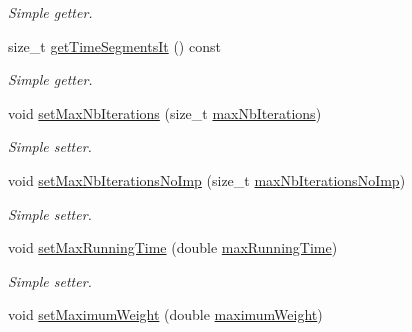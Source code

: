 \begin{DoxyCompactItemize}
\begin{DoxyCompactList}\small\item\em Simple getter. \end{DoxyCompactList}\item 
\hypertarget{classALNS__Parameters_abdf176674f4e3d1885ddb2d6f4c8d21b}{size\-\_\-t \hyperlink{classALNS__Parameters_abdf176674f4e3d1885ddb2d6f4c8d21b}{get\-Time\-Segments\-It} () const }\label{classALNS__Parameters_abdf176674f4e3d1885ddb2d6f4c8d21b}

\begin{DoxyCompactList}\small\item\em Simple getter. \end{DoxyCompactList}\item 
\hypertarget{classALNS__Parameters_a4fccf02da9977844d97530e98939a9c4}{void \hyperlink{classALNS__Parameters_a4fccf02da9977844d97530e98939a9c4}{set\-Max\-Nb\-Iterations} (size\-\_\-t \hyperlink{classALNS__Parameters_ab87f8386bbdca4a6ad80969221241b89}{max\-Nb\-Iterations})}\label{classALNS__Parameters_a4fccf02da9977844d97530e98939a9c4}

\begin{DoxyCompactList}\small\item\em Simple setter. \end{DoxyCompactList}\item 
\hypertarget{classALNS__Parameters_a69e9a3d821eb73ce8c3b390c8e565070}{void \hyperlink{classALNS__Parameters_a69e9a3d821eb73ce8c3b390c8e565070}{set\-Max\-Nb\-Iterations\-No\-Imp} (size\-\_\-t \hyperlink{classALNS__Parameters_ae6c8c9933bbb191ab34eeb09830cb283}{max\-Nb\-Iterations\-No\-Imp})}\label{classALNS__Parameters_a69e9a3d821eb73ce8c3b390c8e565070}

\begin{DoxyCompactList}\small\item\em Simple setter. \end{DoxyCompactList}\item 
\hypertarget{classALNS__Parameters_a4635101db41cd303d5b8f80efced9776}{void \hyperlink{classALNS__Parameters_a4635101db41cd303d5b8f80efced9776}{set\-Max\-Running\-Time} (double \hyperlink{classALNS__Parameters_a237afc869df6332419a24db566695024}{max\-Running\-Time})}\label{classALNS__Parameters_a4635101db41cd303d5b8f80efced9776}

\begin{DoxyCompactList}\small\item\em Simple setter. \end{DoxyCompactList}\item 
\hypertarget{classALNS__Parameters_a2777de08c61e775a79d5e4b9fd927348}{void \hyperlink{classALNS__Parameters_a2777de08c61e775a79d5e4b9fd927348}{set\-Maximum\-Weight} (double \hyperlink{classALNS__Parameters_a907c74cf4c039aafd45af1be5c564f84}{maximum\-Weight})}\label{classALNS__Parameters_a2777de08c61e775a79d5e4b9fd927348}


\end{DoxyCompactItemize}
